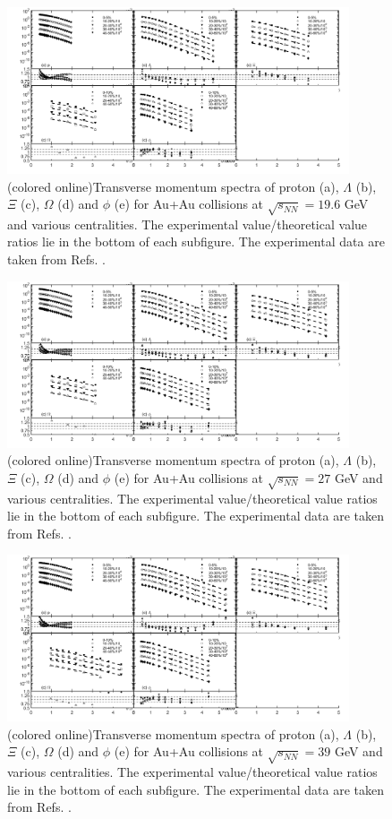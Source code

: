 \documentclass[twocolumn,aps,superscriptaddress,showpacs,nofootinbib,floatfix]{revtex4}
\begin{document}
\begin{figure}[pht]
	\includegraphics[width=0.9\textwidth]{pic11.png}
	\caption{(colored online)Transverse momentum spectra of proton (a), $\Lambda$ (b), $\Xi$ (c), $\Omega$ (d) and $\phi$ (e) for Au+Au collisions at $\sqrt{s_{NN}}=19.6$ GeV and various centralities. The experimental value/theoretical value ratios lie in the bottom of each subfigure. The experimental data are taken from Refs. \cite{STAR:2019bjj,STAR:2017sal,STAR:2015vvs}.}
	\label{fig11}
\end{figure}
\begin{figure}[pht]
	\includegraphics[width=0.9\textwidth]{pic12.png}
	\caption{(colored online)Transverse momentum spectra of proton (a), $\Lambda$ (b), $\Xi$ (c), $\Omega$ (d) and $\phi$ (e) for Au+Au collisions at $\sqrt{s_{NN}}=27$ GeV and various centralities. The experimental value/theoretical value ratios lie in the bottom of each subfigure. The experimental data are taken from Refs. \cite{STAR:2019bjj,STAR:2017sal,STAR:2015vvs}.}
	\label{fig12}
\end{figure}
\begin{figure}[pht]
	\includegraphics[width=0.9\textwidth]{pic13.png}
	\caption{(colored online)Transverse momentum spectra of proton (a), $\Lambda$ (b), $\Xi$ (c), $\Omega$ (d) and $\phi$ (e) for Au+Au collisions at $\sqrt{s_{NN}}=39$ GeV and various centralities. The experimental value/theoretical value ratios lie in the bottom of each subfigure. The experimental data are taken from Refs. \cite{STAR:2019bjj,STAR:2017sal,STAR:2015vvs}.}
	\label{fig13}
\end{figure}
\end{document}
